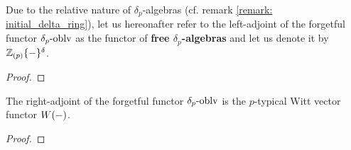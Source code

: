             \begin{corollary} \label{coro: quotients_and_localisations_of_delta_rings}
                
            \end{corollary}    
            \begin{convention} \label{conv: free_delta_rings}
                Due to the relative nature of $\delta_p$-algebras (cf. remark \ref{remark: initial_delta_ring}), let us hereonafter refer to the left-adjoint of the forgetful functor $\delta_p\text{-}\mathrm{oblv}$ as the functor of \textbf{free $\delta_p$-algebras} and let us denote it by $\mathbb{Z}_{(p)}\{-\}^{\delta}$.
            \end{convention}
            \begin{proposition} \label{prop: delta_polynomials}
                
            \end{proposition}
                \begin{proof}
                    
                \end{proof}
            \begin{proposition} \label{prop: witt_vector_rings_are_cofree_delta_rings}
                The right-adjoint of the forgetful functor $\delta_p\text{-}\mathrm{oblv}$ is the $p$-typical Witt vector functor $W(-)$.
            \end{proposition}
                \begin{proof}
                    
                \end{proof}
            
